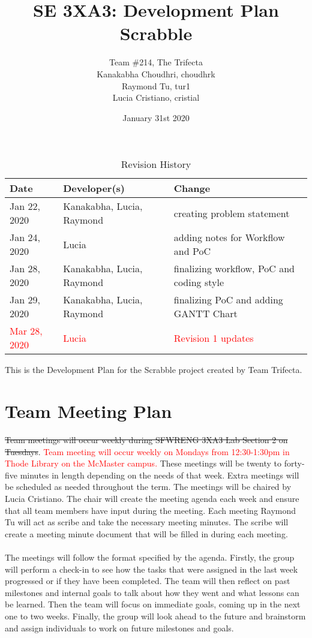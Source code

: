 \documentclass{article}
\title{SE 3XA3: Development Plan\\Scrabble}
\author{Team \#214, The Trifecta
		\\ Kanakabha Choudhri, choudhrk
		\\ Raymond Tu, tur1
		\\ Lucia Cristiano, cristial
}
\date{January 31st 2020}
\begin{document}
\begin{table}[hp]
\caption{Revision History} \label{TblRevisionHistory}
\begin{tabularx}{\textwidth}{llX}
\toprule
\textbf{Date} & \textbf{Developer(s)} & \textbf{Change}\\
\midrule
Jan 22, 2020 & Kanakabha, Lucia, Raymond & creating problem statement\\
Jan 24, 2020 & Lucia & adding notes for Workflow and PoC\\
Jan 28, 2020 & Kanakabha, Lucia, Raymond & finalizing workflow, PoC and coding style\\
Jan 29, 2020 & Kanakabha, Lucia, Raymond & finalizing PoC and adding GANTT Chart\\
\textcolor{red}{Mar 28, 2020} & \textcolor{red}{Lucia} & \textcolor{red}{Revision 1 updates}\\
\bottomrule
\end{tabularx}
\end{table}

\newpage

\maketitle

This is the Development Plan for the Scrabble project created by Team Trifecta.

\section{Team Meeting Plan}
\sout{Team meetings will occur weekly during SFWRENG 3XA3 Lab Section 2 on Tuesdays}. \textcolor{red}{Team meeting will occur weekly on Mondays from 12:30-1:30pm in Thode Library on the McMaster campus.} These meetings will be twenty to forty-five minutes in length depending on the needs of that week. Extra meetings will be scheduled as needed throughout the term. The meetings will be chaired by Lucia Cristiano. The chair will create the meeting agenda each week and ensure that all team members have input during the meeting. Each meeting Raymond Tu will act as scribe and take the necessary meeting minutes. The scribe will create a meeting minute document that will be filled in during each meeting.\\ \\
The meetings will follow the format specified by the agenda. Firstly, the group will perform a check-in to see how the tasks that were assigned in the last week progressed or if they have been completed. The team will then reflect on past milestones and internal goals to talk about how they went and what lessons can be learned. Then the team will focus on immediate goals, coming up in the next one to two weeks. Finally, the group will look ahead to the future and brainstorm and assign individuals to work on future milestones and goals.
\end{document}
